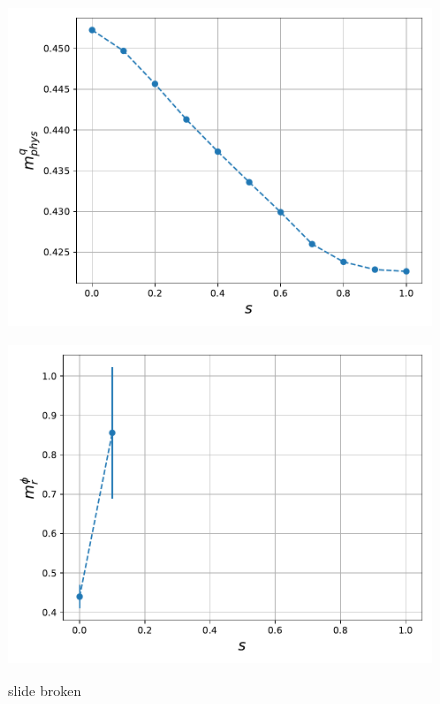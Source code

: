 \begin{figure}
\begin{minipage}{0.45\textwidth}
        \label{fig:slide_broken_cond}
    \end{minipage}
 \begin{minipage}{0.45\textwidth}
    \includegraphics[scale=0.52]{figures/slide_broken/mqphys.pdf}
    \label{fig:slide_broken_mqphys}
\end{minipage}
\hfill
\begin{minipage}{0.45\textwidth}
    \includegraphics[scale=0.52]{figures/slide_broken/mphir.pdf}
    \label{fig:slide_broken_mphir}
\end{minipage}
\caption{slide broken}
\label{fig:slide_broken}
\end{figure}



